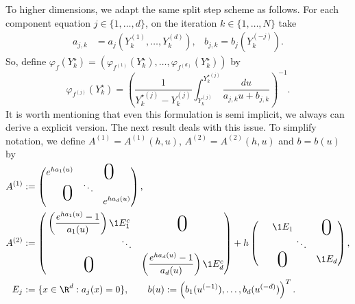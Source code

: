 \documentclass[sort&compress, preprint]{elsarticle}
\theoremstyle{definition}
\theoremstyle{plain}%
\theoremstyle{remark}
\begin{document}
	To higher dimensions, we adapt the same split step scheme  as follows. 
For each component equation $j\in\{1, \ldots,  d\}$, on the iteration $k\in\{1, \ldots,  N\}$ take
\begin{align}
	a_{j,k} &=
	a_j
	\left(
		Y^{(1)}_{k},
		\ldots, Y^{(d)}_{k}
	\right),
	&
	b_{j,k} =
	b_{j}
	\left(
			Y^{(-j)}_k
	\right).
\end{align}
So, define  
$
	\varphi_{f}(Y_k^{\star})=
		\left(
			\varphi_{f^{(1)}}(Y_k^{\star}),
			\ldots,
			\varphi_{f^{(d)}}(Y_k^{\star})
		\right)
$
by
\begin{equation}
	\varphi_{f^{(j)}}\left(Y_k^{\star}\right)
		=
		\left(
			\frac{1}{Y_{k}^{\star(j)}-Y_{k}^{(j)}}
			\int 
				_{Y_{k}^{(j)}}^{Y_{k}^{\star(j)}}
				\frac{du}
				{
					a_{j,k} u
					+b_{j,k}
				}
		\right)^{-1}.
\end{equation}
%
	It is worth mentioning that even this formulation is semi implicit, we always can derive a explicit version. 
The next result deals with this issue. To simplify notation, we define  $A^{(1)}= A^{(1)}(h,u)$,  $A^{(2)}=A^{(2)}(h,u)$  and $b=b(u)$ by 
\begin{align}\label{eqn:SolutionFunctions}	
	A^{(1)}&:=
		\begin{pmatrix}
			e^{ha_1(u)} & \multicolumn{2}{c}{\text{\kern0.5em\smash{\raisebox{-1ex}{\Huge 0}}}} \\
			&\ddots\\
			\multicolumn{2}{c}{\text{\kern-0.5em\smash{\raisebox{0.95ex}{\Huge 0}}}} 
			& e^{ha_d(u)}
		\end{pmatrix},
		\notag
		\\
	A^{(2)}&:=
	\begin{pmatrix}
		\left(
			\displaystyle
			\frac{e^{ha_1(u)} - 1}{a_1(u)}
		\right)\1{E_1^c}%
		&\BigZero\\
		\qquad \qquad \qquad \qquad\ddots&\\
		\BigZero&
		\left(
			\displaystyle
			\frac{e^{ha_d(u)} - 1}{a_d(u)}
		\right)\1{E_d^c}%
	\end{pmatrix}
	+h
	\begin{pmatrix}
		\1{E_1} & \BigZero\\
		\qquad \qquad \ddots\\
		\BigZero & 
		\1{E_d}
	\end{pmatrix},\\	
	E_j&:=\{x \in \R^d: a_j(x)=0\} , \qquad 
	b(u):= \left(
		b_1(u^{(-1)}), \dots , b_d(u^{(-d)})
	\right)^T.		
	\notag
\end{align}
\end{document}
